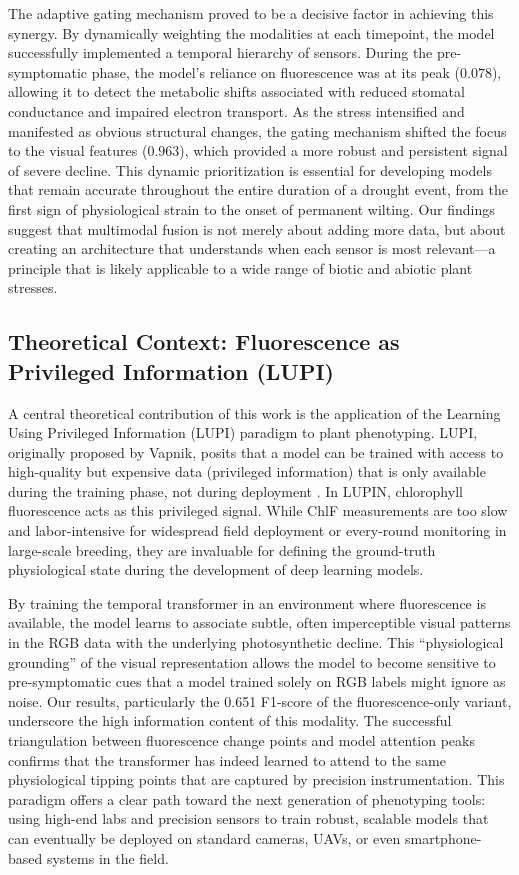 \documentclass[a4paper,fleqn]{cas-dc}
\begin{document}
The adaptive gating mechanism proved to be a decisive factor in achieving this synergy. By dynamically weighting the modalities at each timepoint, the model successfully implemented a temporal hierarchy of sensors. During the pre-symptomatic phase, the model's reliance on fluorescence was at its peak ($0.078$), allowing it to detect the metabolic shifts associated with reduced stomatal conductance and impaired electron transport. As the stress intensified and manifested as obvious structural changes, the gating mechanism shifted the focus to the visual features ($0.963$), which provided a more robust and persistent signal of severe decline. This dynamic prioritization is essential for developing models that remain accurate throughout the entire duration of a drought event, from the first sign of physiological strain to the onset of permanent wilting. Our findings suggest that multimodal fusion is not merely about adding more data, but about creating an architecture that understands when each sensor is most relevant---a principle that is likely applicable to a wide range of biotic and abiotic plant stresses.

\subsection{Theoretical Context: Fluorescence as Privileged Information (LUPI)}\label{sec:discussion:lupi}

A central theoretical contribution of this work is the application of the Learning Using Privileged Information (LUPI) paradigm to plant phenotyping. LUPI, originally proposed by Vapnik, posits that a model can be trained with access to high-quality but expensive data (privileged information) that is only available during the training phase, not during deployment \citep{vapnikNewLearningParadigm2009}. In LUPIN, chlorophyll fluorescence acts as this privileged signal. While ChlF measurements are too slow and labor-intensive for widespread field deployment or every-round monitoring in large-scale breeding, they are invaluable for defining the ground-truth physiological state during the development of deep learning models.

By training the temporal transformer in an environment where fluorescence is available, the model learns to associate subtle, often imperceptible visual patterns in the RGB data with the underlying photosynthetic decline. This ``physiological grounding'' of the visual representation allows the model to become sensitive to pre-symptomatic cues that a model trained solely on RGB labels might ignore as noise. Our results, particularly the 0.651 F1-score of the fluorescence-only variant, underscore the high information content of this modality. The successful triangulation between fluorescence change points and model attention peaks confirms that the transformer has indeed learned to attend to the same physiological tipping points that are captured by precision instrumentation. This paradigm offers a clear path toward the next generation of phenotyping tools: using high-end labs and precision sensors to train robust, scalable models that can eventually be deployed on standard cameras, UAVs, or even smartphone-based systems in the field.
\end{document}
